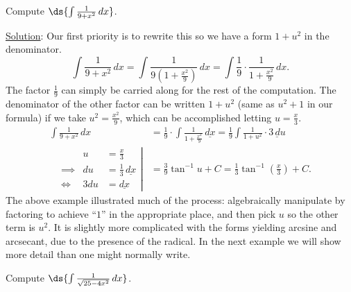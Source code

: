 \bex Compute $\ds{\int\frac1{9+x^2}\,dx}$.

\underline{Solution}: Our first priority is to rewrite this so
we have a form $1+u^2$ in the denominator.
$$\int\frac1{9+x^2}\,dx=\int\frac1{9\left(1+\frac{x^2}9\right)}\,dx
                       =\int\frac19\cdot\frac1{1+\frac{x^2}9}\,dx.$$
The factor $\frac19$ can simply be carried along for the rest of the
computation.  The denominator of the other factor can be
written $1+u^2$  (same as $u^2+1$ in our formula) if we
take $u^2=\frac{x^2}9$, which can be accomplished letting $u=\frac{x}3$.
\begin{align*}
\int\frac1{9+x^2}\,dx&=\frac1{9}\cdot\int\frac1{1+\frac{x^2}9}\,\underline{dx}
                    =\frac1{9}\int\frac{1}{1+u^2}\cdot\underline{3\,du}\\
\left.\begin{alignedat}{2}
&&u&=\frac{x}3\\
&\implies&du&=\frac13\,\underline{dx}\\
&\iff&3du&=\underline{dx}
\end{alignedat}\right|
&=\frac39\tan^{-1}u+C=\frac13\tan^{-1}\left(\frac{x}3\right)+C.\end{align*}
\eex
The above example illustrated much of the process:  algebraically
manipulate by factoring to achieve ``$1$'' in the appropriate place,
and then pick $u$ so the other term is $u^2$.  It is slightly
more complicated with the forms yielding arcsine and arcsecant, 
due to the presence of the radical.  In the next example
we will show more detail than one might normally write.

\bex Compute $\ds{\int\frac1{\sqrt{25-4x^2}}\,dx}$.

